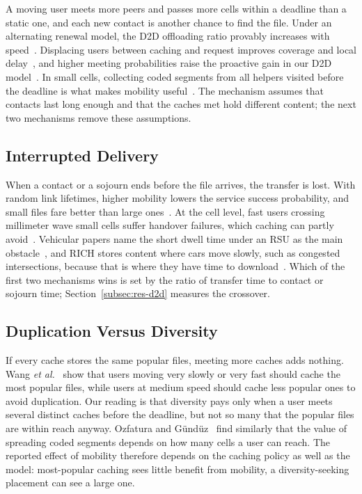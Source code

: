 A moving user meets more peers and passes more cells within a deadline than a static one, and each new contact is another chance to find the file. Under an alternating renewal model, the D2D offloading ratio provably increases with speed~\cite{wang2018exploiting}. Displacing users between caching and request improves coverage and local delay~\cite{krishnan2017mobility}, and higher meeting probabilities raise the proactive gain in our D2D model~\cite{hosny2016allerton}. In small cells, collecting coded segments from all helpers visited before the deadline is what makes mobility useful~\cite{poularakis2013exploiting}. The mechanism assumes that contacts last long enough and that the caches met hold different content; the next two mechanisms remove these assumptions.

\subsection{Interrupted Delivery}
\label{subsec:mech-interrupt}

When a contact or a sojourn ends before the file arrives, the transfer is lost. With random link lifetimes, higher mobility lowers the service success probability, and small files fare better than large ones~\cite{jarray2016mobility}. At the cell level, fast users crossing millimeter wave small cells suffer handover failures, which caching can partly avoid~\cite{semiari2018caching}. Vehicular papers name the short dwell time under an RSU as the main obstacle~\cite{yu2021mobility}, and RICH stores content where cars move slowly, such as congested intersections, because that is where they have time to download~\cite{mahmood2019rich}. Which of the first two mechanisms wins is set by the ratio of transfer time to contact or sojourn time; Section~\ref{subsec:res-d2d} measures the crossover.

\subsection{Duplication Versus Diversity}
\label{subsec:mech-diversity}

If every cache stores the same popular files, meeting more caches adds nothing. Wang \emph{et al.}~\cite{wang2017mobility} show that users moving very slowly or very fast should cache the most popular files, while users at medium speed should cache less popular ones to avoid duplication. Our reading is that diversity pays only when a user meets several distinct caches before the deadline, but not so many that the popular files are within reach anyway. Ozfatura and G\"und\"uz~\cite{ozfatura2020mobility} find similarly that the value of spreading coded segments depends on how many cells a user can reach. The reported effect of mobility therefore depends on the caching policy as well as the model: most-popular caching sees little benefit from mobility, a diversity-seeking placement can see a large one.

